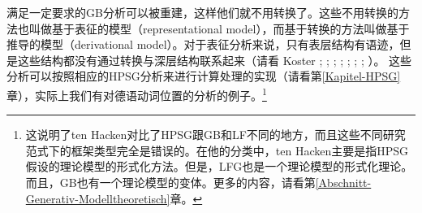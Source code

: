 满足一定要求的GB分析\label{Seite-Representationelle-GB}可以被重建，这样他们就不用转换了。这些不用转换的方法也叫做基于表征的模型（representational model），而基于转换的方法叫做基于推导的模型（derivational model）。对于表征分析来说，只有表层结构有语迹，但是这些结构都没有通过转换与深层结构联系起来（请看 %
Koster \citeyear[\page ]{Koster78b-u}; \citeyear[]{Koster87a-u}; 
\citealp{KT91a}; \citealp[Section~1.4]{Haider93a}; 
\citealp[]{Frey93a}; \citealp[--88, 177--178]{Lohnstein93a-u}; \citealp[]{FC94a}; \citealp[]{Veenstra98a}）。
这些分析可以按照相应的HPSG分析来进行计算处理的实现（请看第\ref{Kapitel-HPSG}章），实际上我们有对德语动词位置的分析的例子。\footnote{%
这说明了ten Hacken对比了HPSG跟GB和LF不同的地方\citep[\S~4.3]{TenHacken2007a}，而且这些不同研究范式下的框架类型完全是错误的。在他的分类中，ten  Hacken主要是指HPSG假设的理论模型的形式化方法。但是，LFG也是一个理论模型的形式化理论\citep{Kaplan95a}。而且，GB也有一个理论模型的变体\citep{Rogers98a-u}。更多的内容，请看第\ref{Abschnitt-Generativ-Modelltheoretisch}章。
}
